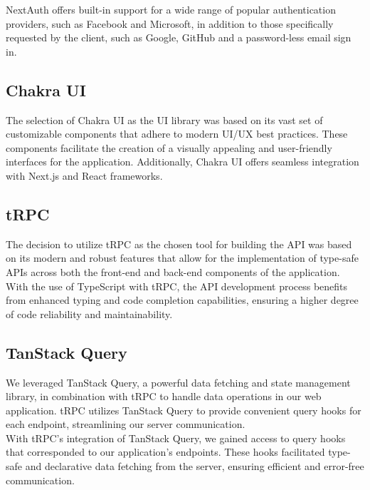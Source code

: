 \noindent
NextAuth offers built-in support for a wide range of popular authentication providers, such as Facebook and Microsoft, in addition to those specifically requested by the client, such as Google, GitHub and a password-less email sign in. \cite{nextauth2022asiuwhu}

\subsection{Chakra UI}

The selection of Chakra UI as the UI library was based on its vast set of customizable components that adhere to modern UI/UX best practices. These components facilitate the creation of a visually appealing and user-friendly interfaces for the application. \cite{chakraui_offical} Additionally, Chakra UI offers seamless integration with Next.js and React frameworks. 

\subsection{tRPC}

The decision to utilize tRPC as the chosen tool for building the API was based on its modern and robust features that allow for the implementation of type-safe APIs across both the front-end and back-end components of the application. \cite{devto_tRPC} With the use of TypeScript with tRPC, the API development process benefits from enhanced typing and code completion capabilities, ensuring a higher degree of code reliability and maintainability. 


\subsection{TanStack Query}
\label{sec:tanStack_query}

We leveraged TanStack Query, a powerful data fetching and state management library, in combination with tRPC to handle data operations in our web application. tRPC utilizes TanStack Query to provide convenient query hooks for each endpoint, streamlining our server communication. \\

\noindent
With tRPC's integration of TanStack Query, we gained access to query hooks that corresponded to our application's endpoints. These hooks facilitated type-safe and declarative data fetching from the server, ensuring efficient and error-free communication. \cite{devto_tanstack_query} \\

